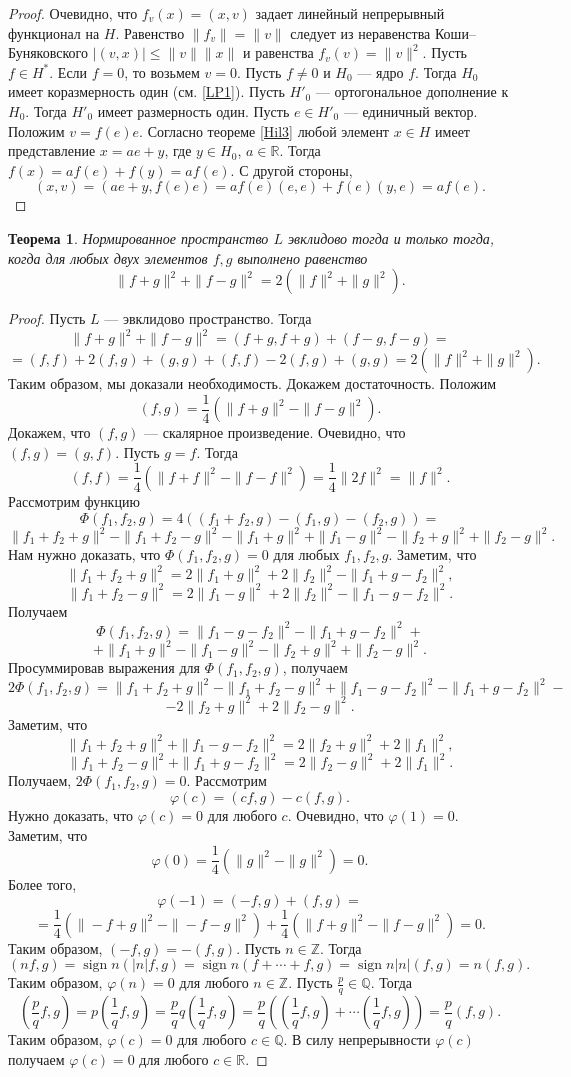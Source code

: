 \documentclass[12pt, titlepage, oneside]{amsbook}
\newcommand{\sign}{\operatorname{sign}}
\newcommand{\ZZ}{\mathbb{Z}}
\newcommand{\RR}{\mathbb{R}}
\newcommand{\QQ}{\mathbb{Q}}
\newtheorem{theorem}{Теорема}[chapter]
\theoremstyle{definition}
\theoremstyle{remark}
\begin{document}
\begin{proof}
	Очевидно, что $f_v(x)=(x,v)$ задает линейный непрерывный функционал на $H$. Равенство $\|f_v\|=\|v\|$ следует из неравенства Коши--Буняковского $|(v,x)|\leq\|v\|\|x\|$ и равенства $f_v(v)=\|v\|^2$. Пусть $f\in H^*$. Если $f=0$, то возьмем $v=0$. Пусть $f\neq 0$ и $H_0$ --- ядро $f$. Тогда $H_0$ имеет коразмерность один (см. \ref{LP1}). Пусть $H'_0$ --- ортогональное дополнение к $H_0$. Тогда $H'_0$ имеет размерность один. Пусть $e\in H'_0$ --- единичный вектор. Положим $v=f(e) e$. Согласно теореме \ref{Hil3} любой элемент $x\in H$ имеет представление $x=ae+y$, где $y\in H_0$, $a\in\RR$. Тогда $f(x)=af(e)+f(y)=af(e)$. С другой стороны, $$(x,v)=(ae+y,f(e)e)=af(e)(e,e)+f(e)(y,e)=af(e).$$
\end{proof}

\begin{theorem}
	\label{Ev4}
	Нормированное пространство $L$ эвклидово тогда и только тогда, когда для любых двух элементов $f,g$ выполнено равенство $$\|f+g\|^2+\|f-g\|^2=2(\|f\|^2+\|g\|^2).$$
\end{theorem}

\begin{proof}
	Пусть $L$ --- эвклидово пространство. Тогда $$\|f+g\|^2+\|f-g\|^2=(f+g,f+g)+(f-g,f-g)=$$ $$=(f,f)+2(f,g)+(g,g)+(f,f)-2(f,g)+(g,g)=2(\|f\|^2+\|g\|^2).$$ Таким образом, мы доказали необходимость. Докажем достаточность. Положим $$(f,g)=\frac{1}{4}(\|f+g\|^2-\|f-g\|^2).$$ Докажем, что $(f,g)$ --- скалярное произведение. Очевидно, что $(f,g)=(g,f)$. Пусть $g=f$. Тогда $$(f,f)=\frac{1}{4}(\|f+f\|^2-\|f-f\|^2)=\frac{1}{4}\|2f\|^2=\|f\|^2.$$ Рассмотрим функцию $$\Phi(f_1,f_2,g)=4((f_1+f_2,g)-(f_1,g)-(f_2,g))=$$ $$\|f_1+f_2+g\|^2-\|f_1+f_2-g\|^2-\|f_1+g\|^2+\|f_1-g\|^2-\|f_2+g\|^2+\|f_2-g\|^2.$$ Нам нужно доказать, что $\Phi(f_1,f_2,g)=0$ для любых $f_1,f_2,g$. Заметим, что $$\|f_1+f_2+g\|^2=2\|f_1+g\|^2+2\|f_2\|^2-\|f_1+g-f_2\|^2,$$ $$\|f_1+f_2-g\|^2=2\|f_1-g\|^2+2\|f_2\|^2-\|f_1-g-f_2\|^2.$$ Получаем $$\Phi(f_1,f_2,g)=\|f_1-g-f_2\|^2-\|f_1+g-f_2\|^2+$$ $$+\|f_1+g\|^2-\|f_1-g\|^2-\|f_2+g\|^2+\|f_2-g\|^2.$$ Просуммировав выражения для $\Phi(f_1,f_2,g)$, получаем $$2\Phi(f_1,f_2,g)=\|f_1+f_2+g\|^2-\|f_1+f_2-g\|^2+\|f_1-g-f_2\|^2-\|f_1+g-f_2\|^2-$$ $$-2\|f_2+g\|^2+2\|f_2-g\|^2.$$ Заметим, что $$\|f_1+f_2+g\|^2+\|f_1-g-f_2\|^2=2\|f_2+g\|^2+2\|f_1\|^2,$$ $$\|f_1+f_2-g\|^2+\|f_1+g-f_2\|^2=2\|f_2-g\|^2+2\|f_1\|^2.$$ Получаем, $2\Phi(f_1,f_2,g)=0$. Рассмотрим $$\varphi(c)=(cf,g)-c(f,g).$$ Нужно доказать, что $\varphi(c)=0$ для любого $c$. Очевидно, что $\varphi(1)=0$. Заметим, что $$\varphi(0)=\frac{1}{4}(\|g\|^2-\|g\|^2)=0.$$ Более того, $$\varphi(-1)=(-f,g)+(f,g)=$$ $$=\frac{1}{4}(\|-f+g\|^2-\|-f-g\|^2)+\frac{1}{4}(\|f+g\|^2-\|f-g\|^2)=0.$$ Таким образом, $(-f,g)=-(f,g)$. Пусть $n\in\ZZ$. Тогда $$(nf,g)=\sign n(|n|f,g)=\sign n(f+\cdots+f,g)=\sign n |n|(f,g)=n(f,g).$$ Таким образом, $\varphi(n)=0$ для любого $n\in\ZZ$. Пусть $\frac{p}{q}\in\QQ$. Тогда $$(\frac{p}{q} f,g)=p(\frac{1}{q} f,g)=\frac{p}{q}q(\frac{1}{q} f,g)=\frac{p}{q}((\frac{1}{q} f,g)+\cdots(\frac{1}{q} f,g))=\frac{p}{q}(f,g).$$ Таким образом, $\varphi(c)=0$ для любого $c\in\QQ$. В силу непрерывности $\varphi(c)$ получаем $\varphi(c)=0$ для любого $c\in\RR$.
\end{proof}
\end{document}
